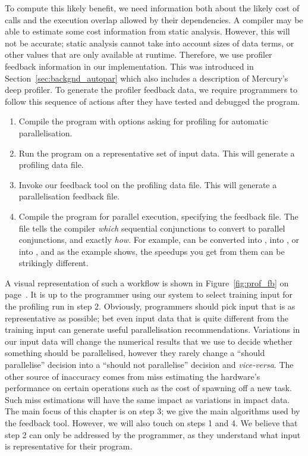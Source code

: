 To compute this likely benefit,
we need information
both about the likely cost of calls
and the execution overlap allowed by their dependencies.
A compiler may be able to estimate some cost information from static
analysis.
However, this will not be accurate;
static analysis cannot take into account sizes of data terms,
or other values that are only available at runtime.
Therefore, we use profiler feedback information in our implementation.
This was introduced in Section~\ref{sec:backgnd_autopar}
which also includes a description of Mercury's deep profiler.
To generate the profiler feedback data,
we require programmers to follow this sequence of actions after they have
tested and debugged the program.

\begin{enumerate}
\item
Compile the program
with options asking for profiling
for automatic parallelisation.
\item
Run the program on a representative set of input data.
This will generate a profiling data file.
\item
Invoke our feedback tool on the profiling data file.
This will generate a parallelisation feedback file.
\item
Compile the program for parallel execution,
specifying the feedback file.
The file tells the compiler
\emph{which} sequential conjunctions to convert to parallel conjunctions,
and exactly \emph{how}.
For example,  can be converted
into ,
into , or
into ,
and as the  example shows,
the speedups you get from them can be strikingly different.
\end{enumerate}

\noindent
A visual representation of such a workflow is shown in 
Figure~\ref{fig:prof_fb} on page~\pageref{fig:prof_fb}.
It is up to the programmer using our system
to select training input for the profiling run in step 2.
Obviously, programmers should pick input that is as representative as
possible;
bet even input data that is quite different from the training input can
generate useful parallelisation recommendations.
Variations in our input data will change the numerical results
that we use to decide whether something should be parallelised,
however they rarely change a ``should parallelise'' decision into a
``should not parallelise'' decision and \emph{vice-versa}.
The other source of inaccuracy comes from miss estimating the hardware's
performance on certain operations such as the cost of spawning off a new
task.
Such miss estimations will have the same impact as variations in impact data.
The main focus of this chapter is on step 3;
we give the main algorithms used by the feedback tool.
However, we will also touch on steps 1 and 4.
We believe that step 2 can only be addressed by the programmer,
as they understand what input is representative for their program.

